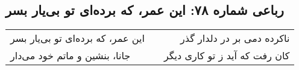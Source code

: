 \begin{center}
\section*{رباعی شماره ۷۸: این عمر، که برده‌ای تو بی‌یار بسر}
\label{sec:078}
\begin{longtable}{l p{0.5cm} r}
این عمر، که برده‌ای تو بی‌یار بسر
&&
ناکرده دمی بر در دلدار گذر
\\
جانا، بنشین و ماتم خود می‌دار
&&
کان رفت که آید ز تو کاری دیگر
\\
\end{longtable}
\end{center}
